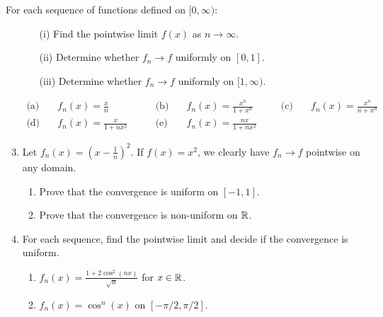 \begin{exercises}
\exstart{}\label{exs:uniform1} For each sequence of functions defined on $[0,\infty)$:\vspace{-1pt}
\begin{enumerate}\setcounter{enumi}{1}\itemsep0pt
	\item[]\begin{enumerate}
    \item[(i)] Find the pointwise limit $f(x)$ as $n\to\infty$.
    \item[(ii)] Determine whether $f_n\to f$ uniformly on $[0,1]$.
    \item[(iii)] Determine whether $f_n\to f$ uniformly on $[1,\infty)$.
  \end{enumerate}\vspace{-12pt}
  \begin{align*}
  \text{(a)}&\quad f_n(x)=\frac xn\qquad 
  &\text{(b)}&\quad f_n(x)=\frac{x^n}{1+x^n}\qquad
  &\text{(c)}&\quad f_n(x)=\frac{x^n}{n+x^n}\\[4pt]
  \text{(d)}&\quad f_n(x)=\frac x{1+nx^2}\qquad
  &\text{(e)}&\quad f_n(x)=\frac{nx}{1+nx^2}
  \end{align*}
 	
 	\item Let $f_n(x)=\left(x-\frac 1n\right)^2$. If $f(x)=x^2$, we clearly have $f_n\to f$ pointwise on any domain.
 	\begin{enumerate}
 	  \item Prove that the convergence is uniform on $[-1,1]$.
 	  \item Prove that the convergence is non-uniform on $\mathbb{R}$.
 	\end{enumerate}
  
  \item For each sequence, find the pointwise limit and decide if the convergence is uniform.
  \begin{enumerate}
    \item $f_n(x)=\frac{1+2\cos^2(nx)}{\sqrt n}$ for $x\in\mathbb{R}$.
    \item $f_n(x)=\cos^n(x)$ on $[-\pi/2,\pi/2]$.
  \end{enumerate}
 	


\end{enumerate}
\end{exercises}
